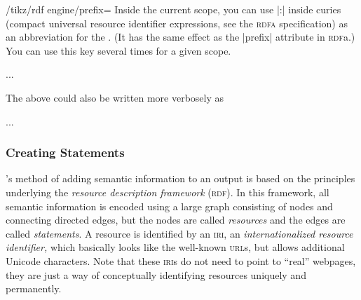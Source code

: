 \begin{key}{/tikz/rdf engine/prefix=}
  Inside the current scope, you can use |:| inside
  curies (compact universal resource identifier expressions, see the
  \textsc{rdfa} specification) as an abbreviation for the
  . (It has the same effect as the |prefix| attribute in
  \textsc{rdf}a.) You can use this key several times for a given scope.
\begin{codeexample}
\scoped [rdf engine = {
  prefix = {rdf: http://www.w3.org/1999/02/22-rdf-syntax-ns\tikzrdfhashmark},
  prefix = {automata: http://www.tcs.uni-luebeck.de/ontologies/2016/04/28/automata/},
  statement = { ..., predicate = rdf:type, object = automata:state },
  statement = { ..., predicate = rdf:type, object = automata:final },
  }] ...
\end{codeexample}
  The above could also be written more verbosely as
\begin{codeexample}
\scoped [rdf engine = {
  statement = { ...,
    predicate = http://www.w3.org/1999/02/22-rdf-syntax-ns\tikzrdfhashmark type, 
    object = http://www.tcs.uni-luebeck.de/ontologies/2016/04/28/automata/state }
  },
  statement = { ...,
    predicate = http://www.w3.org/1999/02/22-rdf-syntax-ns\tikzrdfhashmark type, 
    object = http://www.tcs.uni-luebeck.de/ontologies/2016/04/28/automata/final }
  }] ...
\end{codeexample}
\end{key}



\subsubsection{Creating Statements}

\tikzname's method of adding semantic information to an output is
based on the principles underlying the \emph{resource description
  framework} (\textsc{rdf}). In this framework, all semantic
information is encoded using a large graph consisting of nodes
and connecting directed edges, but the nodes are called
\emph{resources} and the edges are called \emph{statements}. A
resource is identified by an \textsc{iri}, an \emph{internationalized 
  resource identifier,} which basically looks like the well-known
\textsc{url}s, but allows additional Unicode characters. Note that
these \textsc{iri}s do not need to point to ``real'' webpages, they
are just a way of conceptually identifying resources uniquely and
permanently.

